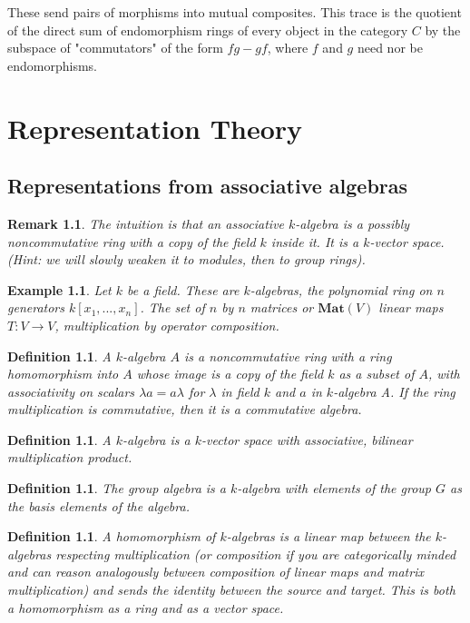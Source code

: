 \documentclass{tufte-book}
\newtheorem{definition}[theorem]{Definition}
\newtheorem{example}[theorem]{Example}
\newtheorem{remark}[theorem]{Remark}
\begin{document}
These send pairs of morphisms into mutual composites. This trace is the quotient of the direct sum of endomorphism rings of every object in the category $C$ by the subspace of 
"commutators" of the form $fg - gf$, where $f$ and $g$ need nor be endomorphisms.

\chapter{Representation Theory}
\label{ch:rep-theory}

\section{Representations from associative algebras}

\begin{remark}
	The intuition is that an associative $k$-algebra is a possibly noncommutative ring with a copy of the field $k$ inside it. It is a $k$-vector space. (Hint: we will slowly weaken it to modules, then to group rings).
\end{remark}

\begin{example}
	Let $k$ be a field. These are $k$-algebras, the polynomial ring on $n$ generators $k[x_1, ..., x_n]$. The set of $n$ by $n$ matrices or $\mathbf{Mat}(V)$ linear maps $T : V \rightarrow V$, multiplication by operator composition.
\end{example}

\begin{definition}
	A $k$-algebra $A$ is a noncommutative ring with a ring homomorphism into $A$ whose image is a copy of the field $k$ as a subset of $A$, with associativity on scalars $\lambda a = a \lambda$ for $\lambda$ in field $k$ and $a$ in $k$-algebra A. If the ring multiplication is commutative, then it is a commutative algebra.  
\end{definition}

\begin{definition}
	A $k$-algebra is a $k$-vector space with associative, bilinear multiplication product.
\end{definition}

\begin{definition}
	The group algebra is a $k$-algebra with elements of the group $G$ as the basis elements of the algebra.
\end{definition}

\begin{definition}
	A homomorphism of $k$-algebras is a linear map between the $k$-algebras respecting multiplication (or composition if you are categorically minded and can reason analogously between composition of linear maps and matrix multiplication) and sends the identity between the source and target. This is both a homomorphism as a ring and as a vector space.
\end{definition}
\end{document}

